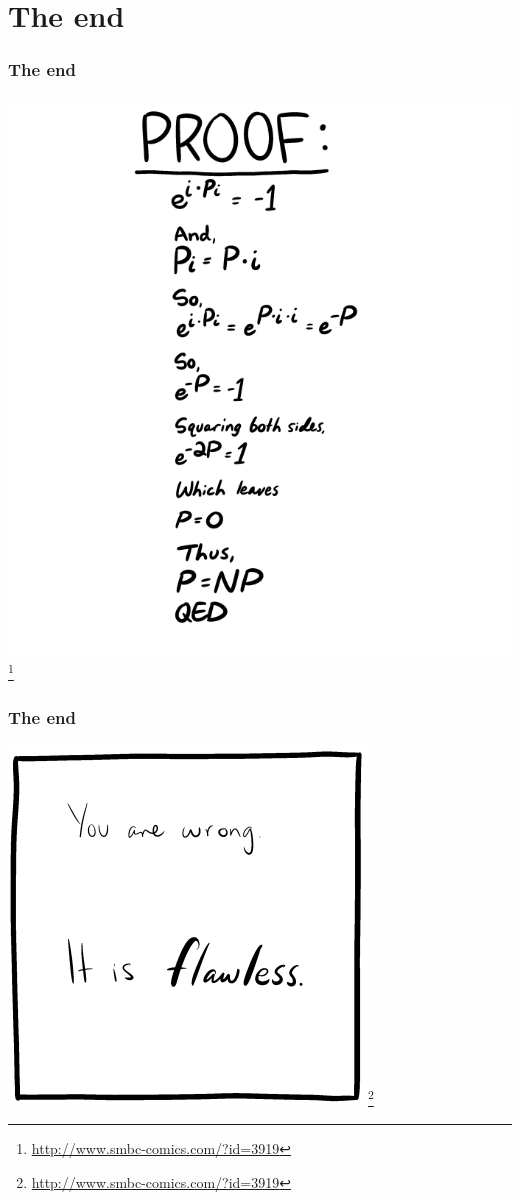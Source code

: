 \documentclass[aspectratio=169]{beamer}
\begin{document}
\section{The end}

\begin{frame}
\begin{center}
\frametitle{The end}
\includegraphics[scale=0.2]{smbc_comic}\footnote{\url{http://www.smbc-comics.com/?id=3919}}
\end{center}
\end{frame}

\begin{frame}
\begin{center}
\frametitle{The end}
\includegraphics[scale=0.5]{smbc_comic_votey}\footnote{\url{http://www.smbc-comics.com/?id=3919}}
\end{center}
\end{frame}

\end{document}

